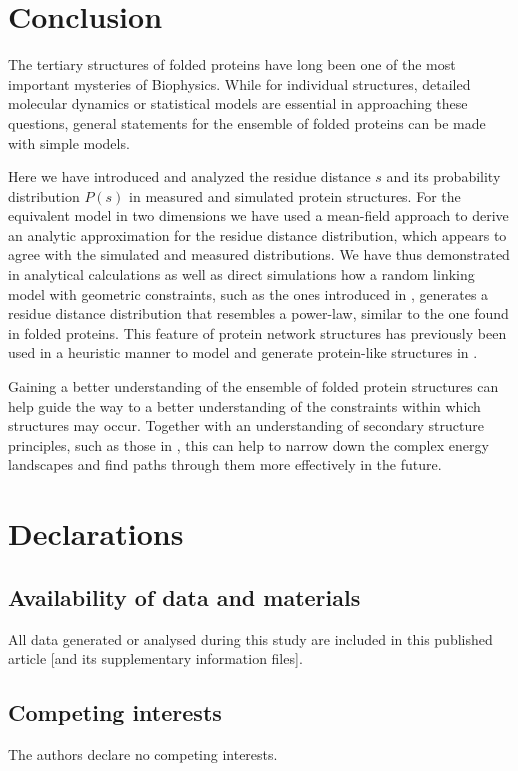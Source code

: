 \documentclass[
reprint,
twocolumn,
amsmath,amssymb,superscriptaddress,aps,
pre]{revtex4-1}
\begin{document}
\section*{Conclusion}
The tertiary structures of folded proteins have long been one of the most important mysteries of Biophysics. While for individual structures, detailed molecular dynamics or statistical models are essential in approaching these questions, general statements for the ensemble of folded proteins can be made with simple models.

Here we have introduced and analyzed the residue distance $s$ and its probability distribution $P(s)$ in measured and simulated protein structures. For the equivalent model in two dimensions we have used a mean-field approach to derive an analytic approximation for the residue distance distribution, which appears to agree with the simulated and measured distributions.
We have thus demonstrated in analytical calculations as well as direct simulations how a random linking model with geometric constraints, such as the ones introduced in \cite{molkenthin2016scaling, molkenthin2020self}, generates a residue distance distribution that resembles a power-law, similar to the one found in folded proteins. This feature of protein network structures has previously been used in a heuristic manner to model and generate protein-like structures in \cite{bartoli2008effect}.

Gaining a better understanding of the ensemble of folded protein structures can help guide the way to a better understanding of the constraints within which structures may occur. Together with an understanding of secondary structure principles, such as those in
\cite{Danielsson2010, Molkenthin2011}, this can help to narrow down the complex energy landscapes and find paths through them more effectively in the future.

\section*{Declarations}
\subsection{Availability of data and materials}
All data generated or analysed during this study are included in this published article [and its supplementary information files].
\subsection{Competing interests}
The authors declare no competing interests.
\end{document}
